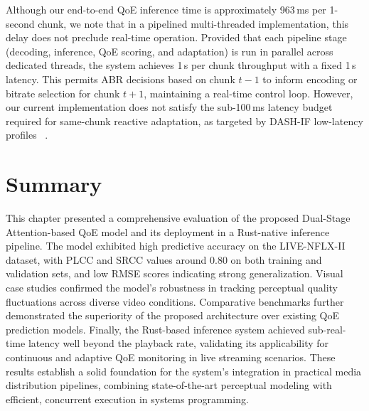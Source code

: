 Although our end-to-end QoE inference time is approximately 963\,ms per 1-second chunk, we note that in a pipelined multi-threaded 
implementation, this delay does not preclude real-time operation. Provided that each pipeline stage (decoding, inference, QoE scoring, and adaptation) 
is run in parallel across dedicated threads, the system achieves 1\,s per chunk throughput with a fixed 1\,s latency. This permits ABR decisions 
based on chunk $t{-}1$ to inform encoding or bitrate selection for chunk $t{+}1$, maintaining a real-time control loop. However, our current 
implementation does not satisfy the sub-100\,ms latency budget required for same-chunk reactive adaptation, as targeted by DASH-IF low-latency 
profiles ~\cite{dash-if2022}.

\section*{Summary}

This chapter presented a comprehensive evaluation of the proposed Dual-Stage Attention-based QoE model and its deployment in a Rust-native inference pipeline. 
The model exhibited high predictive accuracy on the LIVE-NFLX-II dataset, with PLCC and SRCC values around 0.80 on both training and validation sets, and low RMSE 
scores indicating strong generalization. Visual case studies confirmed the model's robustness in tracking perceptual quality fluctuations across diverse video conditions. 
Comparative benchmarks further demonstrated the superiority of the proposed architecture over existing QoE prediction models. 
Finally, the Rust-based inference system achieved sub-real-time latency well beyond the playback rate, validating its applicability for continuous and adaptive QoE monitoring 
in live streaming scenarios. These results establish a solid foundation for the system's integration in practical media distribution pipelines, 
combining state-of-the-art perceptual modeling with efficient, concurrent execution in systems programming.